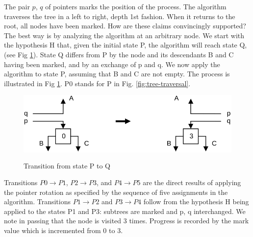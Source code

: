 The pair $p$, $q$ of pointers marks the position of the process. The algorithm traverses
the tree in a left to right, depth 1st fashion. When it returns to the root, all nodes
have been marked. How are these claims convincingly supported? The best way is by analyzing
the algorithm at an arbitrary node. We start with the hypothesis H that, given the initial
state P, the algorithm will reach state Q, (see Fig \ref{fig:transition}). State Q differs
from P by the node and its descendants B and C having been marked, and by an exchange of p
and q. We now apply the algorithm to state P, assuming that B and C are not empty. The process
is illustrated in Fig \ref{fig:transition}. P0 stands for P in Fig. \ref{fig:tree-traversal}.
\begin{figure}[h!]
  \centering
  \includegraphics[width=\textwidth]{i/u}
  \label{fig:transition}
  \caption{Transition from state P to Q}
\end{figure}
Transitions $P0 \rightarrow P1$, $P2 \rightarrow P3$, and $P4 \rightarrow P5$ are the direct
results of applying the pointer rotation as specified by the sequence of five assignments
in the algorithm. Transitions $P1 \rightarrow P2$ and $P3 \rightarrow P4$ follow from the
hypothesis H being applied to the states P1 and P3: subtrees are marked and p, q interchanged.
We note in passing that the node is visited 3 times. Progress is recorded by the mark value
which is incremented from 0 to 3.


